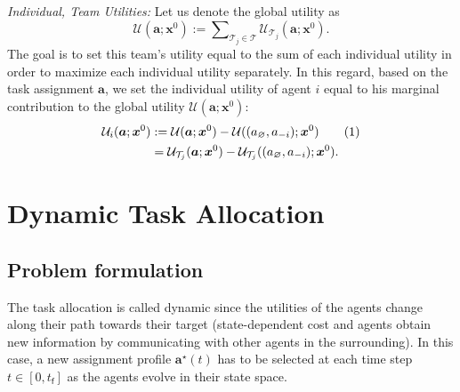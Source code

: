 \documentclass{ifacconf}
\newcommand\numberthis{\addtocounter{equation}{1}\tag{\theequation}}
\newcommand{\f}{{\mathsf{f}}}
\newcommand{\cT}{\mathcal{T}}
\newcommand{\cU}{\mathcal{U}}
\begin{document}
\noindent \textit{Individual, Team Utilities:} 
Let us denote the global utility
as
\begin{equation}\label{eq:teamutility}
\cU(\bm{a};\bm{x}^0) := \sum\nolimits_{\cT_j\in \cT} \cU_{\cT_j}(\bm{a};\bm{x}^0).
\end{equation}
The goal is to set this team's utility equal to the sum of each individual utility in order to maximize each individual utility separately. In this regard, based on the task assignment $\bm{a}$, we set the individual utility of agent $i$ equal to his marginal contribution to the global utility $\cU(\bm{a};\bm{x}^0)$:
\begin{align*}
\cU_{i}(\bm{a};\bm{x}^0) & := \cU(\bm{a}; \bm{x}^0) - \cU((a_{\varnothing}, a_{-i}); \bm{x}^0) \numberthis \label{eq:marginaleq1} \\
& = \cU_{\cT_j}(\bm{a}; \bm{x}^0) - \cU_{\cT_j}((a_{\varnothing}, a_{-i}); \bm{x}^0).
\end{align*}

\section{Dynamic Task Allocation}\label{s:RHTA}

\subsection{Problem formulation}
The task allocation is called dynamic since the utilities of the agents change along their path towards their target (state-dependent cost and agents obtain new information by communicating with other agents in the surrounding). In this case, a new assignment profile $\bm{a}^{\star}(t)$ has to be selected at each time step $t \in [0,t_\f]$ as the agents evolve in their state space.
\end{document}
